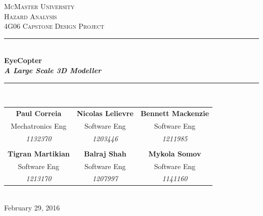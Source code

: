 \documentclass[10pt,letterpaper]{article}
\begin{document}
	
	
	\begin{titlepage}
		\newcommand{\HRule}{\rule{\linewidth}{0.5mm}}
		\center
		
		\textsc{\LARGE McMaster University}\\[1.5cm] %
		\textsc{\Large Hazard Analysis}\\[0.5cm] %
		\textsc{\large 4G06 Capstone Design Project}\\[0.5cm] %
		
		\HRule \\[0.4cm] 
		{ \huge \bfseries EyeCopter \\[2mm] \textit{A Large Scale 3D Modeller}}\\[0.4cm] %
		\HRule \\[1.5cm]
		
		\begin{tabular}{ccc}
			\bf{Paul Correia}		& \bf{Nicolas Lelievre} 	& \bf{Bennett Mackenzie}		\\
			Mechatronics Eng 		& Software Eng 				& Software Eng 					\\
			\textit{1132370} 		& \textit{1203446}			& \textit{1211985} 				\\ \\
			\bf{Tigran Martikian} 	& \bf{Balraj Shah} 			& \bf{Mykola Somov} 			\\
			Software Eng			& Software Eng				& Software Eng 					\\
			\textit{1213170} 		& \textit{1207997}			& \textit{1141160}
		\end{tabular}\\[4cm]
		
		{\large February 29, 2016}\\[3cm] 
		
		
		\vfill %
		
	\end{titlepage}
	
    
\thispagestyle{empty}

\tableofcontents


\newpage


\thispagestyle{empty}

\listoffigures
\end{document}
